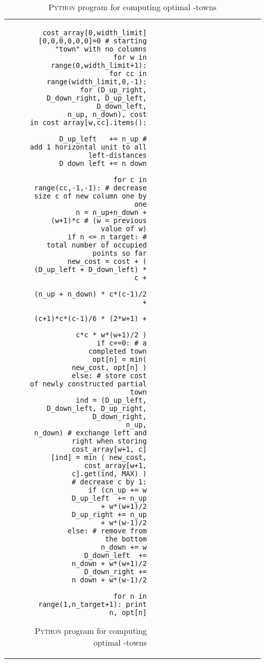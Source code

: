 \documentclass[preprint,authoryear,12pt]{elsarticle}
\begin{document}
\begin{table}
{\begin{tabular}{|r|rr|rr|r||r|rr|rr|r|}
{\begin{figure}
{\begin{verbatim}
cost_array[0,width_limit][0,0,0,0,0,0]=0 # starting "town" with no columns
for w in range(0,width_limit+1):
 for cc in range(width_limit,0,-1):
  for (D_up_right, D_down_right, D_up_left, D_down_left,
       n_up, n_down), cost in cost_array[w,cc].items():
\end{verbatim}
\vspace{-1,7\baselineskip}
\begin{verbatim}
    D_up_left   += n_up # add 1 horizontal unit to all left-distances
    D_down_left += n_down
\end{verbatim}
\vspace{-1,7\baselineskip}
\begin{verbatim}
    for c in range(cc,-1,-1): # decrease size c of new column one by one
      n = n_up+n_down + (w+1)*c # (w = previous value of w)
      if n <= n_target: # total number of occupied points so far
        new_cost = cost + ( (D_up_left + D_down_left) * c +
                            (n_up + n_down) * c*(c-1)/2 +
                            (c+1)*c*(c-1)/6 * (2*w+1) +
                            c*c * w*(w+1)/2 )
        if c==0: # a completed town
          opt[n] = min( new_cost, opt[n] )
        else: # store cost of newly constructed partial town
          ind = (D_up_left, D_down_left, D_up_right, D_down_right,
                 n_up, n_down) # exchange left and right when storing
          cost_array[w+1, c][ind] = min ( new_cost,
          cost_array[w+1, c].get(ind, MAX) )
      # decrease c by 1:
      if (cn_up += w
          D_up_left  += n_up + w*(w+1)/2
          D_up_right += n_up + w*(w-1)/2
      else: # remove from the bottom
          n_down += w
          D_down_left  += n_down + w*(w+1)/2
          D_down_right += n_down + w*(w-1)/2
\end{verbatim}
\vspace{-1,6\baselineskip}
\begin{verbatim}
for n in range(1,n_target+1): print n, opt[n]
\end{verbatim}
}

  \caption{\textsc{Python} program for computing optimal -towns}
  \label{fig:program}
\end{figure}

}
\end{tabular}}
\end{table}
\end{document}
